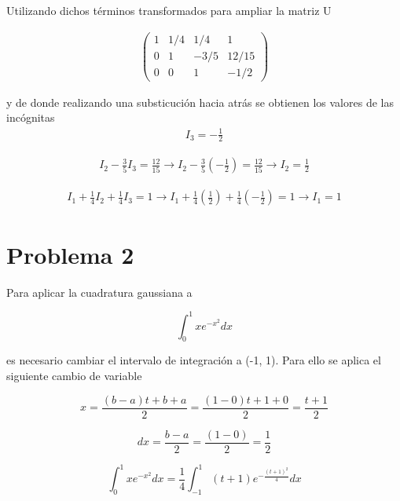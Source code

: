 \documentclass[a4paper, 12pt]{article}
\begin{document}
Utilizando dichos términos transformados para ampliar la matriz U

\begin{align*}
\begin{pmatrix}
  1 & 1/4 & 1/4 & 1\\
  0 & 1 & -3/5 & 12/15 \\
  0 & 0 & 1 & -1/2
\end{pmatrix}
\end{align*}

y de donde realizando una substicución hacia atrás se obtienen los valores de
las incógnitas
\begin{align*}
I_3 = -\frac{1}{2}
\end{align*}

\begin{align*}
I_2 - \frac{3}{5}I_3 = \frac{12}{15} 
\rightarrow
I_2 - \frac{3}{5}(-\frac{1}{2}) = \frac{12}{15}
\rightarrow
I_2 = \frac{1}{2}
\end{align*}

\begin{align*}
I_1 + \frac{1}{4}I_2 + \frac{1}{4}I_3 = 1 
\rightarrow
I_1 + \frac{1}{4}(\frac{1}{2}) + \frac{1}{4}(-\frac{1}{2}) = 1 
\rightarrow
I_1 = 1
\end{align*}

\section*{Problema 2}
Para aplicar la cuadratura gaussiana a 

\begin{equation*}
	\int^{1}_{0} x e^{-x^2} dx
\end{equation*}

es necesario cambiar el intervalo de integración a (-1, 1). Para ello se aplica
el siguiente cambio de variable

\begin{equation*}
x = \frac{(b - a)t + b + a}{2} = \frac{(1 - 0)t + 1 + 0}{2} = \frac{t + 1}{2}
\end{equation*}

\begin{equation*}
dx = \frac{b - a}{2} = \frac{(1 - 0)}{2} = \frac{1}{2}
\end{equation*}

\begin{equation*}
	\int^{1}_{0} x e^{-x^2} dx =
	\frac{1}{4}\int^{1}_{-1} (t + 1) e^{-\frac{(t + 1)^2}{4}} dx
\end{equation*}
\end{document}
